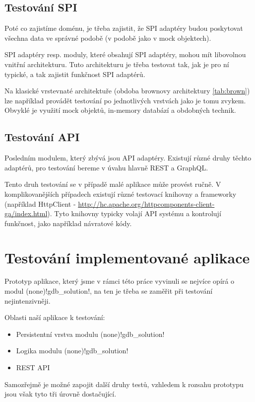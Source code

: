 \subsection{Testování SPI}
Poté co zajistíme doménu, je třeba zajistit, že SPI adaptéry budou poskytovat všechna data ve správné podobě (v podobě jako v mock objektech).\par
SPI adaptéry resp. moduly, které obsahují SPI adaptéry, mohou mít libovolnou vnitřní architekturu. Tuto architekturu je třeba testovat tak, jak je pro ní typické, a tak zajistit funkčnost SPI adaptérů.\par
Na klasické vrstevnaté architektuře (obdoba brownovy architektury \ref{tab:brown}) lze například provádět testování po jednotlivých vrstvách jako je tomu zvykem. Obvyklé je využití mock objektů, in-memory databází a obdobných technik.
\subsection{Testování API}
Posledním modulem, který zbývá jsou API adaptéry. Existují různé druhy těchto adaptérů, pro testování bereme v úvahu hlavně REST a GraphQL.\par
Tento druh testování se v případě malé aplikace může provést ručně. V komplikovanějších případech existují různé testovací knihovny a frameworky (například HttpClient - \url{http://hc.apache.org/httpcomponents-client-ga/index.html}). Tyto knihovny typicky volají API systému a kontrolují funkčnost, jako například návratové kódy.

\section{Testování implementované aplikace}
Prototyp aplikace, který jsme v rámci této práce vyvinuli se nejvíce opírá o modul \ctulst(none)!gdb_solution!, na ten je třeba se zaměřit při testování nejintenzivněji.\par
\noindent Oblasti naší aplikace k testování:
\begin{itemize}
    \item Persistentní vrstva modulu \ctulst(none)!gdb_solution!
    \item Logika modulu \ctulst(none)!gdb_solution!
    \item REST API
\end{itemize}
Samozřejmě je možné zapojit další druhy testů, vzhledem k rozsahu prototypu jsou však tyto tři úrovně dostačující.
